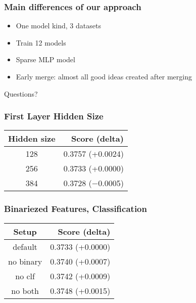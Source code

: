 \begin{frame}
    \frametitle{Main differences of our approach}
    \begin{itemize}
        \item One model kind, 3 datasets
        \item Train 12 models
        \item Sparse MLP model
        \item Early merge: almost all good ideas created after merging
    \end{itemize}
\end{frame}

\begin{frame}
    \begin{center}
        \Huge Questions?
    \end{center}
\end{frame}


\begin{frame}
    \frametitle{First Layer Hidden Size}
    \begin{center}
        \begin{tabular}{c|r}
            Hidden size & Score (delta) \\\hline
            128 & 0.3757 (+0.0024) \\
            256 & 0.3733 (+0.0000) \\
            384 & 0.3728 ($-$0.0005)
        \end{tabular}
    \end{center}
\end{frame}

\begin{frame}
    \frametitle{Binariezed Features, Classification}
    \begin{center}
        \begin{tabular}{c|r}
            Setup & Score (delta) \\\hline
            default & 0.3733 (+0.0000) \\
            no binary & 0.3740 (+0.0007) \\
            no clf & 0.3742 (+0.0009) \\
            no both & 0.3748 (+0.0015)
        \end{tabular}
    \end{center}
\end{frame}
